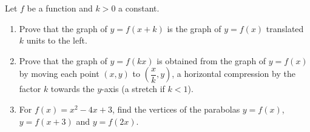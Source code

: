 Let $f$ be a function and $k>0$ a constant.
\begin{enumerate}
\item[(a)] Prove that the graph of $y=f(x+k)$ is the graph of $y=f(x)$ translated $k$ units to the left.
\item[(b)] Prove that the graph of $y=f(kx)$ is obtained from the graph of $y=f(x)$ by moving each point $(x,y)$ to $\left(\dfrac xk,y\right)$, a horizontal compression by the factor $k$ towards the $y$-axis (a stretch if $k<1$).
\item[(c)] For $f(x)=x^2-4x+3$, find the vertices of the parabolas $y=f(x)$, $y=f(x+3)$ and $y=f(2x)$.
\end{enumerate}
